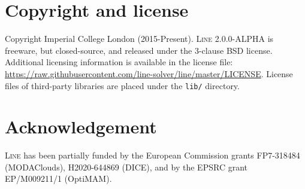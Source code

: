 \section{Copyright and license}
Copyright Imperial College London (2015-Present). \textsc{Line} 2.0.0-ALPHA is freeware, but closed-source, and released under the 3-clause BSD license. Additional licensing information is available in the license file: \url{https://raw.githubusercontent.com/line-solver/line/master/LICENSE}. License files of third-party libraries are placed under the \texttt{lib/} directory.

\section{Acknowledgement}
\textsc{Line} has been partially funded by the European Commission grants FP7-318484 (MODAClouds), H2020-644869 (DICE), and by the EPSRC grant EP/M009211/1 (OptiMAM).

